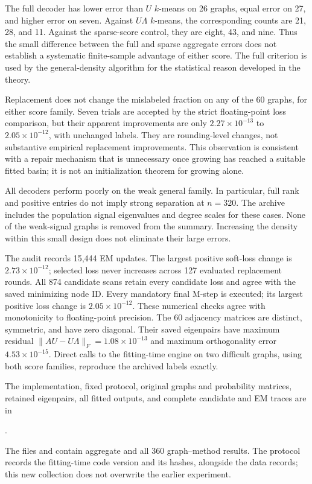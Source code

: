 The full decoder has lower error than $U$ $k$-means on 26 graphs, equal
error on 27, and higher error on seven. Against $U\Lambda$ $k$-means, the
corresponding counts are 21, 28, and 11. Against the sparse-score control,
they are eight, 43, and nine. Thus the small difference between the full and
sparse aggregate errors does not establish a systematic finite-sample
advantage of either score. The full criterion is used by the general-density
algorithm for the statistical reason developed in the theory.

Replacement does not change the mislabeled fraction on any of the 60
graphs, for either score family. Seven trials are accepted by the strict
floating-point loss comparison, but their apparent improvements are only
$2.27\times10^{-13}$ to $2.05\times10^{-12}$, with unchanged labels.
They are rounding-level changes, not substantive empirical replacement
improvements. This observation is consistent with a repair mechanism that
is unnecessary once growing has reached a suitable fitted basin; it is not
an initialization theorem for growing alone.

All decoders perform poorly on the weak general family. In particular,
full rank and positive entries do not imply strong separation at $n=320$.
The archive includes the population signal eigenvalues and degree scales
for these cases. None of the weak-signal graphs is removed from the summary.
Increasing the density within this small design does not eliminate their
large errors.

The audit records 15,444 EM updates. The largest positive soft-loss change
is $2.73\times10^{-12}$; selected loss never increases across 127 evaluated
replacement rounds. All 874 candidate scans retain every candidate loss
and agree with the saved minimizing node ID. Every mandatory final M-step
is executed; its largest positive loss change is $2.05\times10^{-12}$.
These numerical checks agree with monotonicity to floating-point precision.
The 60 adjacency matrices are distinct, symmetric, and have zero diagonal.
Their saved eigenpairs have maximum residual
$\|AU-U\Lambda\|_F=1.08\times10^{-13}$ and maximum orthogonality error
$4.53\times10^{-15}$. Direct calls to the fitting-time engine on two difficult
graphs, using both score families, reproduce the archived labels exactly.

The implementation, fixed protocol, original graphs and probability
matrices, retained eigenpairs, all fitted outputs, and complete candidate
and EM traces are in
\begin{center}
.
\end{center}
The files  and
 contain aggregate and all
360 graph--method results. The protocol records the fitting-time code version
and its hashes, alongside the data records; this new collection does not
overwrite the earlier experiment.

